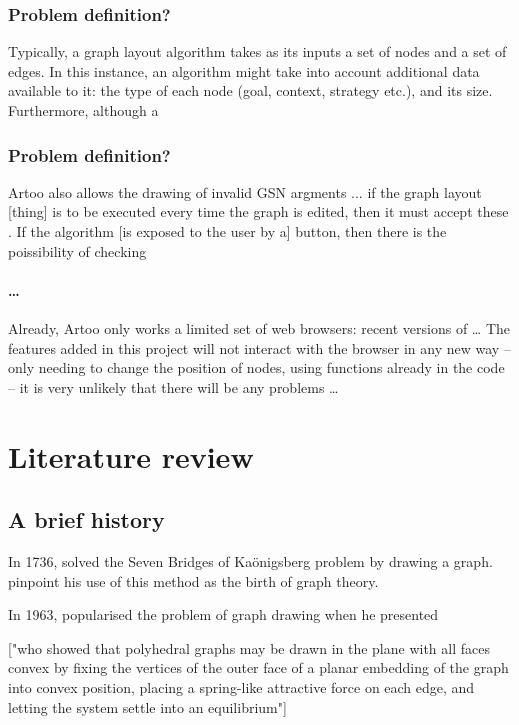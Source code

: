 \documentclass[authoryearcitations]{UoYCSproject}
\begin{document}
\begin{itemize*}
\subsection{Problem definition?}

Typically, a graph layout algorithm takes as its inputs a set of nodes and a set of edges.
In this instance, an algorithm might take into account additional data available to it:
the type of each node (goal, context, strategy etc.), and its size.
Furthermore, although a 

\subsection{Problem definition?}


Artoo also allows the drawing of invalid GSN argments ...
if the graph layout [thing] is to be executed every time the graph is edited, then it must accept these .
If the algorithm [is exposed to the user by a] button, then there is the poissibility of checking 

\subsubsection{\ldots}

Already, Artoo only works a limited set of web browsers: recent versions of \ldots
The features added in this project will not interact with the browser in any new way -- only needing to change the position of nodes, using functions already in the code -- it is very unlikely that there will be any problems \ldots



\chapter{Literature review}

\section{A brief history}

In 1736, \citet{euler} solved the Seven Bridges of Ka\"{o}nigsberg problem by drawing a graph.
\citet{ismail2009some}
pinpoint his use of this method as the birth of graph theory.

In 1963, \citet{tutte} popularised the problem of graph drawing when he presented 


["who showed that polyhedral graphs may be drawn in the plane with all faces convex by fixing the vertices of the outer face of a planar embedding of the graph into convex position, placing a spring-like attractive force on each edge, and letting the system settle into an equilibrium"]


\end{itemize*}
\end{document}
